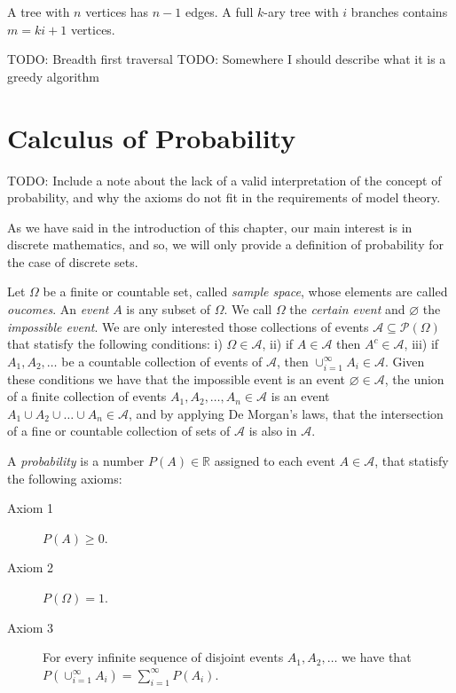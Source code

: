 \begin{example}
A tree with $n$ vertices has $n-1$ edges. A full $k$-ary tree with $i$ branches contains $m=ki+1$ vertices.
\end{example}

{\color{red} TODO: Breadth first traversal}
{\color{red} TODO: Somewhere I should describe what it is a greedy algorithm}

%
%

\section{Calculus of Probability}
\label{sec:probability}

{\color{red} TODO: Include a note about the lack of a valid interpretation of the concept of probability, and why the axioms do not fit in the requirements of model theory.}

As we have said in the introduction of this chapter, our main interest is in discrete mathematics, and so, we will only provide a definition of probability for the case of discrete sets.

Let $\Omega$ be a finite or countable set, called \emph{sample space}, whose elements are called \emph{oucomes}. An \emph{event} $A$ is any subset of $\Omega$. We call $\Omega$ the \emph{certain event} and $\varnothing$ the \emph{impossible event}. We are only interested those collections of events $\mathcal{A} \subseteq \mathcal{P}\left( \Omega \right)$ that statisfy the following conditions: i) $\Omega \in \mathcal{A}$, ii) if $A \in \mathcal{A}$ then $A^c \in \mathcal{A}$, iii) if $A_1, A_2, \ldots$ be a countable collection of events of $\mathcal{A}$, then $\cup_{i=1}^\infty A_i \in \mathcal{A}$. Given these conditions we have that the impossible event is an event $\varnothing \in \mathcal{A}$, the union of a finite collection of events $A_1, A_2, \ldots, A_n \in \mathcal{A}$ is an event $A_1 \cup A_2 \cup \ldots \cup A_n \in \mathcal{A}$, and by applying De Morgan's laws, that the intersection of a fine or countable collection of sets of $\mathcal{A}$ is also in $\mathcal{A}$.

A \emph{probability} is a number $P(A) \in \mathbb{R}$ assigned to each event $A \in \mathcal{A}$, that statisfy the following axioms:

\begin{description}

\item [Axiom 1] $P(A) \geq 0$.

\item [Axiom 2] $P(\Omega) = 1$.

\item [Axiom 3] For every infinite sequence of disjoint events $A_1, A_2, \ldots$ we have that $P(\cup_{i=1}^\infty A_i) = \sum_{i=1}^\infty P(A_i)$.

\end{description}

